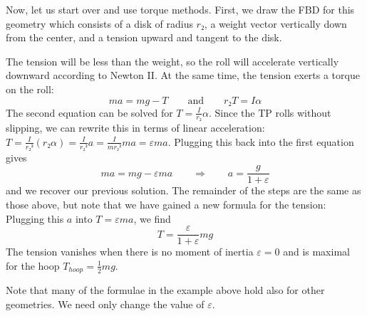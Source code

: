 \begin{example}
\begin{solution}
Now, let us start over and use torque methods. 
First, we draw the FBD for this geometry which consists of a disk of radius $r₂$, a weight vector vertically down from the center, and a tension upward and tangent to the disk. 

The tension will be less than the weight, so the roll will accelerate vertically downward according to Newton II. At the same time, the tension exerts a torque on the roll:
$$
ma = mg-T
\quad \quad \textrm{and}\quad \quad 
r₂ T = I α 
$$
The second equation can be solved for $T= \frac I{r₂} α$. Since the TP rolls without slipping, we can rewrite this in terms of linear acceleration: $T= \frac I{r₂² } (r₂α) = \frac I{r₂² } a = \frac I{mr₂² } ma =  ε m a$. Plugging this back into the first equation gives 
$$
ma = mg-ε ma
\quad \quad ⇒ \quad \quad 
a = \frac g{1+ε}
$$
and we recover our previous solution. The remainder of the steps are the same as those above, but note that we have gained a new formula for the tension: Plugging this $a$ into $T=ε ma$, we find 
$$
T= \frac{ε}{1+ε} mg
$$
The tension vanishes when there is no moment of inertia $ε =0$ and is maximal for the hoop $T_{hoop} = \frac12 mg$.
\end{solution}
\end{example}
Note that many of the formulae in the example above hold also for other geometries. We need only change the value of $ε$. 



